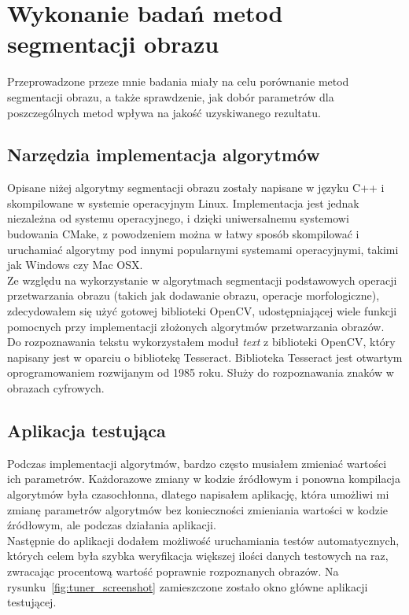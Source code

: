 \section{Wykonanie badań metod segmentacji obrazu}
Przeprowadzone przeze mnie badania miały na celu porównanie metod segmentacji obrazu, a także sprawdzenie, jak dobór parametrów dla poszczególnych metod wpływa na jakość uzyskiwanego rezultatu.

\subsection{Narzędzia implementacja algorytmów}
Opisane niżej algorytmy segmentacji obrazu zostały napisane w języku C++ i skompilowane w systemie operacyjnym Linux. Implementacja jest jednak niezależna od systemu operacyjnego, i dzięki uniwersalnemu systemowi budowania CMake, z powodzeniem można w łatwy sposób skompilować i uruchamiać algorytmy pod innymi popularnymi systemami operacyjnymi, takimi jak Windows czy Mac OSX.\\
Ze względu na wykorzystanie w algorytmach segmentacji podstawowych operacji przetwarzania obrazu (takich jak dodawanie obrazu, operacje morfologiczne), zdecydowałem się użyć gotowej biblioteki OpenCV, udostępniającej wiele funkcji pomocnych przy implementacji złożonych algorytmów przetwarzania obrazów.\\
Do rozpoznawania tekstu wykorzystałem moduł \textit{text} z biblioteki OpenCV, który napisany jest w oparciu o bibliotekę Tesseract. Biblioteka Tesseract jest otwartym oprogramowaniem rozwijanym od 1985 roku. Służy do rozpoznawania znaków w obrazach cyfrowych.
\subsection{Aplikacja testująca}
Podczas implementacji algorytmów, bardzo często musiałem zmieniać wartości ich parametrów. Każdorazowe zmiany w kodzie źródłowym i ponowna kompilacja algorytmów była czasochłonna, dlatego napisałem aplikację, która umożliwi mi zmianę parametrów algorytmów bez konieczności zmieniania wartości w kodzie źródłowym, ale podczas działania aplikacji.\\
Następnie do aplikacji dodałem możliwość uruchamiania testów automatycznych, których celem była szybka weryfikacja większej ilości danych testowych na raz, zwracając procentową wartość poprawnie rozpoznanych obrazów. Na rysunku~\ref{fig:tuner_screenshot} zamieszczone zostało okno główne aplikacji testującej.

